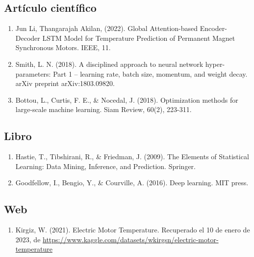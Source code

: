 \documentclass{article}
\begin{document}
\pagebreak







\subsection{Artículo científico}

\begin{enumerate}
    \item 
Jun Li, Thangarajah Akilan, (2022). Global Attention-based Encoder-Decoder LSTM Model for Temperature Prediction of Permanent Magnet Synchronous Motors. IEEE, 11.
\item 
 Smith, L. N. (2018). A disciplined approach to neural network hyper-parameters: Part 1 – learning rate, batch size, momentum, and weight decay. arXiv preprint arXiv:1803.09820.
\item
Bottou, L., Curtis, F. E., & Nocedal, J. (2018). Optimization methods for large-scale machine learning. Siam Review, 60(2), 223-311.
\end{enumerate} 
\subsection{Libro}

\begin{enumerate}
    \item 
Hastie, T., Tibshirani, R., & Friedman, J. (2009). The Elements of Statistical Learning: Data Mining, Inference, and Prediction. Springer.
   \item 
   Goodfellow, I., Bengio, Y., & Courville, A. (2016). Deep learning. MIT press. 
\end{enumerate} 

\subsection{Web}
\begin{enumerate}
  \item 
Kirgiz, W. (2021). Electric Motor Temperature. Recuperado el 10 de enero de 2023, de \url{https://www.kaggle.com/datasets/wkirgsn/electric-motor-temperature}
\end{enumerate} 
\end{document}
